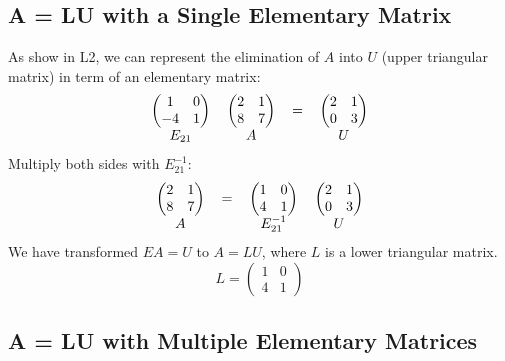 \documentclass[12pt]{article}
\begin{document}
\subsection{A = LU with a Single Elementary Matrix}
As show in L2, we can represent the elimination of $A$ into $U$ (upper triangular matrix) in term of an elementary matrix:
\[ 
  \begin{tabular}{cccc}
    $\left(
        \begin{matrix}
            1 & 0\\
            -4 & 1
        \end{matrix}
    \right)$ &
    $\left(
        \begin{matrix}
            2 & 1\\
            8 & 7
        \end{matrix}
    \right)$ &
    $=$ & 
    $\left(
        \begin{matrix}
            2 & 1\\
            0 & 3
        \end{matrix}
    \right)$\\
    $E_{21}$ & $A$ & & $U$
  \end{tabular}
\]
Multiply both sides with $E_{21}^{-1}$:
\[
  \begin{tabular}{cccc}
    $\left(
        \begin{matrix}
            2 & 1\\
            8 & 7
        \end{matrix}
    \right)$ &
    $=$ & 
    $\left(
        \begin{matrix}
            1 & 0\\
            4 & 1
        \end{matrix}
    \right)$ &
    $\left(
        \begin{matrix}
            2 & 1\\
            0 & 3
        \end{matrix}
    \right)$\\
    $A$ & & $E_{21}^{-1}$ & $U$
  \end{tabular}
\]
We have transformed $EA=U$ to $A=LU$, where $L$ is a lower triangular matrix.
\[
L=
\left(
    \begin{matrix}
        1 & 0\\
        4 & 1
    \end{matrix}
\right)
\]

\subsection{A = LU with Multiple Elementary Matrices}
\end{document}
